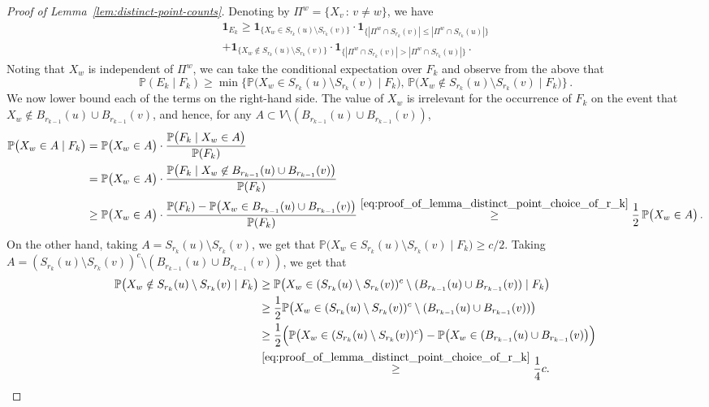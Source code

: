 \documentclass[11pt, reqno]{article}
\numberwithin{equation}{section}
\theoremstyle{definition}
\def\P{\mathbb{P}}
\newcommand{\1}{\mathds{1}}
\begin{document}
\begin{proof}[Proof of Lemma~\ref{lem:distinct-point-counts}]
    Denoting by $\Pi^w =\{ X_v \, : \, v\not=w \}$, we have
    \begin{multline*}
    \mathbf{1}_{E_k} \ge \mathbf{1}_{\{X_w \in S_{r_k}(u) \setminus S_{r_k}(v)\}} \cdot \mathbf{1}_{\{|\Pi^w \cap S_{r_k}(v)| \le |\Pi^w \cap S_{r_k}(u)| \}} \\ +  \mathbf{1}_{\{X_w \notin S_{r_k}(u) \setminus S_{r_k}(v)\}} \cdot \mathbf{1}_{\{|\Pi^w \cap S_{r_k}(v)| > |\Pi^w \cap S_{r_k}(u)|\}} \, .
    \end{multline*}
    Noting that $X_w$ is independent of $\Pi^w$, we can take the conditional expectation over $F_k$ and observe from the above that
    \begin{equation} \label{eq:proof_of_lemmma_distinct_points_lower_bound_after_case_decomposition}
    \P(E_k \mid F_k )\ge \min\Big\{ \P\big(X_w \in S_{r_k}(u) \setminus S_{r_k}(v) \mid F_k \big) , \, \P\big(X_w \not \in S_{r_k}(u) \setminus S_{r_k}(v) \mid F_k \big)  \Big\} \, .    
    \end{equation}
    We now lower bound each of the terms on the right-hand side.
    The value of $X_w$ is irrelevant for the occurrence of $F_k$ on the event that $X_w \notin B_{r_{k-1}}(u) \cup B_{r_{k-1}}(v)$, and hence, for any $A \subset V \setminus (B_{r_{k-1}}(u) \cup B_{r_{k-1}}(v))$,
    \begin{align*}
        \P\big(X_w \in A \mid F_k \big) &= \P\big(X_w \in A \big) \cdot \frac{\P\big(F_k \mid X_w \in A \big)}{\P(F_k)} \\
        &= \P\big(X_w \in A \big) \cdot \frac{\P\big(F_k \mid X_w \not \in B_{r_{k-1}}(u) \cup B_{r_{k-1}}(v) \big)}{\P(F_k)} \\
        & \ge  \P\big(X_w \in A \big) \cdot \frac{\P(F_k) - \P\big( X_w \in B_{r_{k-1}}(u) \cup B_{r_{k-1}}(v) \big)}{\P(F_k)} \stackrel{\eqref{eq:proof_of_lemma_distinct_point_choice_of_r_k}}\ge \frac12 \, \P\big(X_w \in A \big) \, .
    \end{align*}
    On the other hand, taking $A=S_{r_k}(u) \setminus S_{r_k}(v)$, we get that $\P\big(X_w \in S_{r_k}(u) \setminus S_{r_k}(v) \mid F_k \big) \ge c/2$.
    Taking $A=(S_{r_k}(u) \setminus S_{r_k}(v))^c \setminus (B_{r_{k-1}}(u) \cup B_{r_{k-1}}(v))$, we get that
    \begin{align*}
       \P\big(X_w \notin S_{r_k}(u) \setminus S_{r_k}(v) \mid F_k \big) &\ge \P\big(X_w \in  (S_{r_k}(u) \setminus S_{r_k}(v))^c \setminus (B_{r_{k-1}}(u) \cup B_{r_{k-1}}(v))  \mid F_k \big) \\ & \ge \frac{1}{2} \P\big(X_w \in  (S_{r_k}(u) \setminus S_{r_k}(v))^c \setminus (B_{r_{k-1}}(u) \cup B_{r_{k-1}}(v))  \big) \\ &\ge \frac{1}{2} \Big(\P\big(X_w \in  (S_{r_k}(u) \setminus S_{r_k}(v))^c   \big) -  \P \big(X_w\in (B_{r_{k-1}}(u) \cup B_{r_{k-1}}(v) \big) \Big) \\  &\stackrel{\eqref{eq:proof_of_lemma_distinct_point_choice_of_r_k}}\ge \frac14 c . 

\end{align*}
\end{proof}
\end{document}
